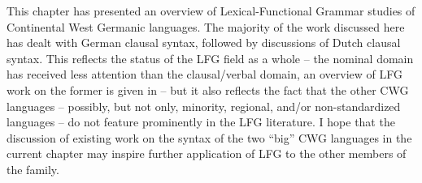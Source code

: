 \documentclass[output=paper,hidelinks]{langscibook}
\begin{document}
This chapter has presented an overview of Lexical-Functional Grammar
studies of Continental West Germanic languages. The majority of the
work discussed here has dealt with German clausal syntax,
followed by discussions of Dutch clausal syntax. This reflects the status of the 
LFG field as a whole -- the nominal domain has received less attention than the 
clausal\slash verbal domain, an overview of LFG work on the former is given in 
 – but it also
reflects the fact that the other CWG languages -- possibly, but not
only, minority, regional, and/or non-standardized languages -- do not
feature prominently in the LFG literature. I hope that the discussion
of existing work on the syntax of the two ``big'' CWG languages in the
current chapter may inspire further application of LFG to the other
members of the family.
\end{document}
